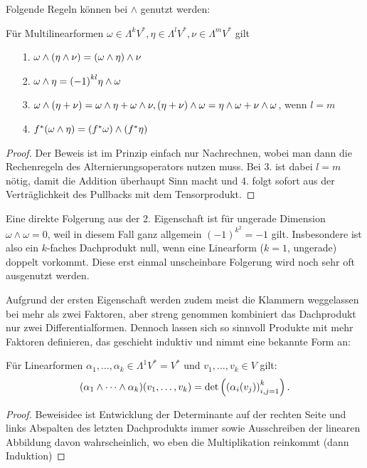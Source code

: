 \documentclass[../H_Analysis_main.tex]{subfiles}
\begin{document}
Folgende Regeln können bei $\wedge$ genutzt werden:
\begin{satz}\label{satz:regelndachpr}
Für Multilinearformen $\omega \in \Lambda^k V^*, \eta \in \Lambda^l V^*, \nu \in \Lambda^m V^*$ gilt
\begin{itemize}
\item[1.] $\omega \wedge \qty(\eta \wedge \nu) = \qty(\omega \wedge \eta) \wedge \nu$

\item[2.] $\omega \wedge \eta = \qty(-1)^{k l} \eta \wedge \omega$

\item[3.] $\omega \wedge \qty(\eta + \nu) = \omega \wedge \eta + \omega \wedge \nu, \qty(\eta + \nu) \wedge \omega = \eta \wedge \omega + \nu \wedge \omega$, wenn $l = m$

\item[4.] $f^*(\omega \wedge \eta) = \qty(f^*\omega) \wedge \qty(f^*\eta)$
\end{itemize}
\end{satz}
\begin{proof}
Der Beweis ist im Prinzip einfach nur Nachrechnen, wobei man dann die Rechenregeln des Alternierungsoperators nutzen muss. Bei 3. ist dabei $l = m$ nötig, damit die Addition überhaupt Sinn macht und 4. folgt sofort aus der Verträglichkeit des Pullbacks mit dem Tensorprodukt.
\end{proof}

Eine direkte Folgerung aus der 2. Eigenschaft ist für ungerade Dimension $\omega \wedge \omega = 0$, weil in diesem Fall ganz allgemein $(-1)^{k^2} = -1$ gilt. Insbesondere ist also ein $k$-faches Dachprodukt null, wenn eine Linearform ($k = 1$, ungerade) doppelt vorkommt. Diese erst einmal unscheinbare Folgerung wird noch sehr oft ausgenutzt werden.

Aufgrund der ersten Eigenschaft werden zudem meist die Klammern weggelassen bei mehr als zwei Faktoren, aber streng genommen kombiniert das Dachprodukt nur zwei Differentialformen. Dennoch lassen sich so sinnvoll Produkte mit mehr Faktoren definieren, das geschieht induktiv und nimmt eine bekannte Form an:

\begin{satz}
Für Linearformen $\alpha_1, \dots, \alpha_k \in \Lambda^1 V^* = V^*$ und $v_1, \dots, v_k \in V$ gilt:
\begin{equation}
\qty(\alpha_1 \wedge \dots \wedge \alpha_k)\qty(v_1, \dots, v_k) = \det\qty(\qty(\alpha_i(v_j))_{i, j = 1}^k) \, .
\end{equation}
\end{satz}
\begin{proof}
Beweisidee ist Entwicklung der Determinante auf der rechten Seite und links Abspalten des letzten Dachprodukts immer sowie Ausschreiben der linearen Abbildung davon wahrscheinlich, wo eben die Multiplikation reinkommt (dann Induktion)
\end{proof}
\end{document}
